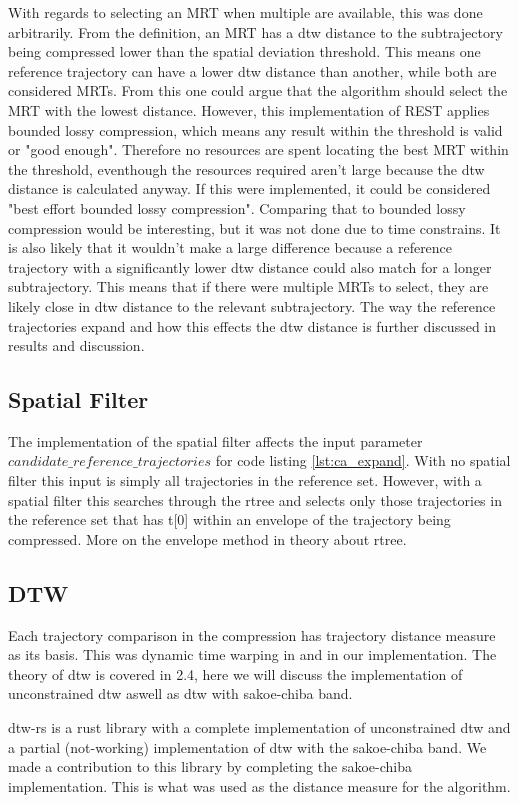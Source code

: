 With regards to selecting an MRT when multiple are available, this was done arbitrarily. From the definition, an MRT has a dtw distance to the subtrajectory being compressed lower than the spatial deviation threshold. This means one reference trajectory can have a lower dtw distance than another, while both are considered MRTs. From this one could argue that the algorithm should select the MRT with the lowest distance. However, this implementation of REST applies bounded lossy compression, which means any result within the threshold is valid or "good enough". Therefore no resources are spent locating the best MRT within the threshold, eventhough the resources required aren't large because the dtw distance is calculated anyway. If this were implemented, it could be considered "best effort bounded lossy compression". Comparing that to bounded lossy compression would be interesting, but it was not done due to time constrains. It is also likely that it wouldn't make a large difference because a reference trajectory with a significantly lower dtw distance could also match for a longer subtrajectory. This means that if there were multiple MRTs to select, they are likely close in dtw distance to the relevant subtrajectory. The way the reference trajectories expand and how this effects the dtw distance is further discussed in results and discussion. %

\subsection{Spatial Filter}
The implementation of the spatial filter affects the input parameter $candidate\_reference\_trajectories$ for code listing \ref{lst:ca_expand}. With no spatial filter this input is simply all trajectories in the reference set. However, with a spatial filter this searches through the rtree and selects only those trajectories in the reference set that has t[0] within an envelope of the trajectory being compressed. More on the envelope method in theory about rtree.
\subsection{DTW}
Each trajectory comparison in the compression has trajectory distance measure as its basis. This was dynamic time warping in \cite{zhao2018rest} and in our implementation. The theory of dtw is covered in 2.4, here we will discuss the implementation of unconstrained dtw aswell as dtw with sakoe-chiba band.

dtw-rs is a rust library with a complete implementation of unconstrained dtw and a partial (not-working) implementation of dtw with the sakoe-chiba band. We made a contribution to this library by completing the sakoe-chiba implementation. This is what was used as the distance measure for the algorithm.